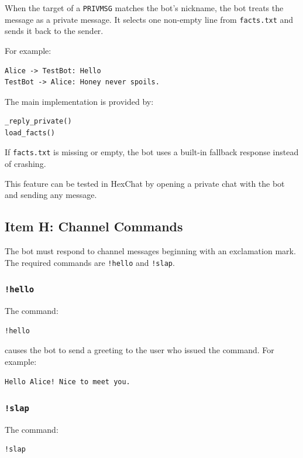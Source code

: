 \documentclass[a4paper,12pt]{article}
\begin{document}
When the target of a \texttt{PRIVMSG} matches the bot's nickname, the bot treats the message as a private message. It selects one non-empty line from \texttt{facts.txt} and sends it back to the sender.

For example:

\begin{verbatim}
Alice -> TestBot: Hello
TestBot -> Alice: Honey never spoils.
\end{verbatim}

The main implementation is provided by:

\begin{lstlisting}[language=Python]
_reply_private()
load_facts()
\end{lstlisting}

If \texttt{facts.txt} is missing or empty, the bot uses a built-in fallback response instead of crashing.

This feature can be tested in HexChat by opening a private chat with the bot and sending any message.

\subsection{Item H: Channel Commands}

The bot must respond to channel messages beginning with an exclamation mark. The required commands are \texttt{!hello} and \texttt{!slap}.

\subsubsection{\texttt{!hello}}

The command:

\begin{verbatim}
!hello
\end{verbatim}

causes the bot to send a greeting to the user who issued the command. For example:

\begin{verbatim}
Hello Alice! Nice to meet you.
\end{verbatim}

\subsubsection{\texttt{!slap}}

The command:

\begin{verbatim}
!slap
\end{verbatim}
\end{document}
